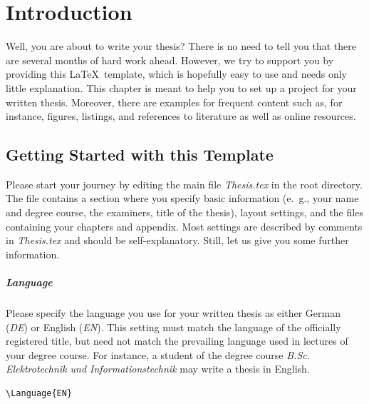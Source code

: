 \chapter{Introduction}
\label{chapter:Introduction}

Well, you are about to write your thesis? There is no need to tell you that there are several months of hard work ahead. However, we try to support you by providing this \LaTeX\ template, which is hopefully easy to use and needs only little explanation. This chapter is meant to help you to set up a project for your written thesis. Moreover, there are examples for frequent content such as, for instance, figures, listings, and references to literature as well as online resources.

\section{Getting Started with this Template}

Please start your journey by editing the main file \emph{Thesis.tex} in the root directory. The file contains a section where you specify basic information (e.~g., your name and degree course, the examiners, title of the thesis), layout settings, and the files containing your chapters and appendix. Most settings are described by comments in \emph{Thesis.tex} and should be self-explanatory. Still, let us give you some further information.


\paragraph{Language} Please specify the language you use for your written thesis as either German (\emph{DE}) or English (\emph{EN}). This setting must match the language of the officially registered title, but need not match the prevailing language used in lectures of your degree course. For instance, a student of the degree course \emph{B.Sc. Elektrotechnik und Informationstechnik} may write a thesis in English.
%
\begin{lstlisting}[language=bash]
\Language{EN}
\end{lstlisting}

